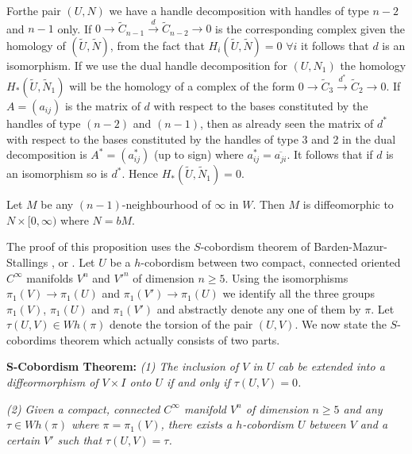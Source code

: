  For\pageoriginale the pair $(U, N)$ we have a handle decomposition
 with handles of 
 type $n-2$ and $n-1$ only. If $0 \to \tilde{C}_{n-1}
 \xrightarrow{d} \tilde{C}_{n-2} \to 0$ is the corresponding complex
 given the homology of $(\tilde{U}, \tilde{N})$, from the fact that
 $H_i (\tilde{U}, \tilde{N})=0$ $\forall i$ it follows that $d$ is an
 isomorphism. If we use the dual handle decomposition for $(U, N_1)$
 the homology $H_* (\tilde{U}, \tilde{N}_1)$ will be the homology of a
 complex of the form $0 \to \tilde{C}_3 \xrightarrow{d^*} \tilde{C}_2
 \to 0$. If $A=(a_{ij})$ is the matrix of $d$ with respect to the
 bases constituted by the handles of type $(n-2)$ and $(n-1)$, then as
 already seen the matrix of $d^*$ with respect to the bases
 constituted by the handles of type 3 and 2 in the dual decomposition
 is $A^*= (a^*_{ij})$ (up to sign) where $a^*_{ij}=
 \overline{a_{ji}}$. It follows that if $d$ is an isomorphism so is
 $d^*$. Hence $H_* (\tilde{U}, \tilde{N}_1)=0$. 

 \setcounter{prop}{1}
 \begin{prop}\label{chap2:prop5.2}%
Let $M$ be any $(n-1)$-neighbourhood of $\infty$ in $W$. Then $M$ is
diffeomorphic to $N \times [0, \infty)$ where $N=bM$. 
 \end{prop} 
 
 The proof of this proposition uses the $S$-cobordism theorem of\break
 Barden-Mazur-Stallings \cite{c2:key5}, \cite{c2:key6} or \cite{c2:key8}. Let
 $U$ be a $h$-cobordism  between two compact, connected oriented
 $C^{\infty}$ manifolds $V^n$  and $V'^n$ of dimension $n \geq
 5$. Using the isomorphisms $\pi_1 (V) 
 \to \pi_1 (U)$ and $\pi_1 (V')\to \pi_1 (U)$ we identify all the
 three groups $\pi_1 (V)$, $\pi_1 (U)$ and $\pi_1 (V')$ and abstractly
 denote any one of them by $\pi$. Let $\tau (U, V) \in Wh (\pi)$
 denote the torsion of the pair $(U, V)$. We now state the
 $S$-cobordims theorem which actually consists of two parts. 
 
\bigskip
 \noindent\textbf{S-Cobordism Theorem:}\pageoriginale
\textit{{\em (1)} The inclusion of $V$ in $U$ cab be extended into a
 diffeormorphism of $V \times I$ onto $U$ if and only if $\tau (U,
 V)=0$. } 

\smallskip
\noindent
\textit{{\em (2)} Given a compact, connected $C^\infty$ manifold $V^n$
 of dimension $n \geq 5$ and any $\tau \in Wh (\pi)$ where $\pi=
 \pi_1 (V)$, there exists a $h$-cobordism $U$ between $V$ and a
 certain $V'$ such that $\tau (U, V)= \tau$.}
 

